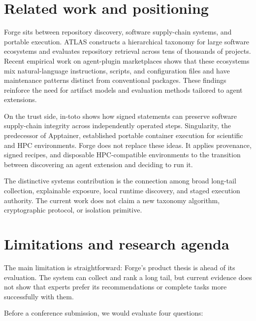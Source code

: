 \documentclass[10pt,twocolumn]{article}
\begin{document}
\section{Related work and positioning}

Forge sits between repository discovery, software supply-chain systems, and portable execution. ATLAS constructs a hierarchical taxonomy for large software ecosystems and evaluates repository retrieval across tens of thousands of projects.\cite{atlas2026} Recent empirical work on agent-plugin marketplaces shows that these ecosystems mix natural-language instructions, scripts, and configuration files and have maintenance patterns distinct from conventional packages.\cite{hereiz2026} These findings reinforce the need for artifact models and evaluation methods tailored to agent extensions.

On the trust side, in-toto shows how signed statements can preserve software supply-chain integrity across independently operated steps.\cite{intoto2019} Singularity, the predecessor of Apptainer, established portable container execution for scientific and HPC environments.\cite{singularity2017} Forge does not replace these ideas. It applies provenance, signed recipes, and disposable HPC-compatible environments to the transition between discovering an agent extension and deciding to run it.

The distinctive systems contribution is the connection among broad long-tail collection, explainable exposure, local runtime discovery, and staged execution authority. The current work does not claim a new taxonomy algorithm, cryptographic protocol, or isolation primitive.

\section{Limitations and research agenda}

The main limitation is straightforward: Forge's product thesis is ahead of its evaluation. The system can collect and rank a long tail, but current evidence does not show that experts prefer its recommendations or complete tasks more successfully with them.

Before a conference submission, we would evaluate four questions:
\end{document}
